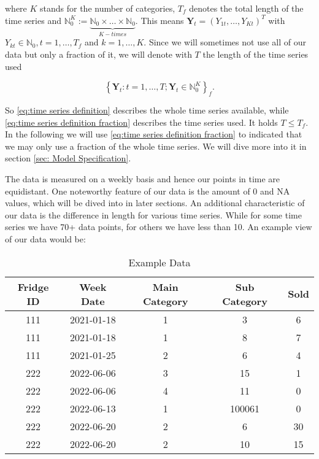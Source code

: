 where $K$ stands for the number of categories, $T_f$ denotes the total length of the time series and $\mathbb{N}_0^K := \underbrace{\mathbb{N}_0 \times \ldots \times \mathbb{N}_0}_{K-times}$. This means $\bm{Y}_t = (Y_{1t},\ldots,Y_{Kt})^T$ with $Y_{kt} \in \mathbb{N}_0, t=1,\ldots,T_f$ and $k=1,\ldots,K$. Since we will sometimes not use all of our data but only a fraction of it, we will denote with $T$ the length of the time series used

\begin{equation}
\left\{\bm{Y}_t:t=1,\ldots,T; \bm{Y}_t \in \mathbb{N}_0^K \right\}_f.
\label{eq:time series definition fraction}
\end{equation}

So \ref{eq:time series definition} describes the whole time series available, while \ref{eq:time series definition fraction} describes the time series used. It holds $T\leq T_f$. In the following we will use \ref{eq:time series definition fraction} to indicated that we may only use a fraction of the whole time series. We will dive more into it in section \ref{sec: Model Specification}.

The data is measured on a weekly basis and hence our points in time are equidistant. One noteworthy feature of our data is the amount of 0 and NA values, which will be dived into in later sections. An additional characteristic of our data is the difference in length for various time series. While for some time series we have 70+ data points, for others we have less than 10. An example view of our data would be: 

\begin{table}[h!]
\centering
\begin{tabular}{ccccc}
\hline
\rowcolor[HTML]{FFFFFF} 
\textbf{Fridge ID} & \textbf{Week Date} & \textbf{Main Category} & \textbf{Sub Category} & \textbf{Sold} \\ \hline
111                & 2021-01-18         & 1                      & 3                     & 6             \\
111                & 2021-01-18         & 1                      & 8                     & 7             \\
111                & 2021-01-25         & 2                      & 6                     & 4             \\
222                & 2022-06-06         & 3                      & 15                    & 1             \\
222                & 2022-06-06         & 4                      & 11                    & 0             \\
222                & 2022-06-13         & 1                      & 100061                & 0             \\
222                & 2022-06-20         & 2                      & 6                     & 30            \\
222                & 2022-06-20         & 2                      & 10                    & 15            \\ \hline
\end{tabular}
\caption{Example Data}
\label{tab:ExampleData}
\end{table}

